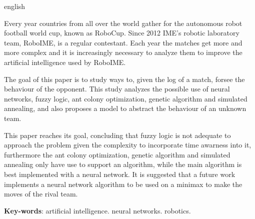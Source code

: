 \documentclass[
	12pt,				%
	oneside,			%
	a4paper,			%
	english,			%
	brazil,				%
	]{ime-abntex2}
\begin{document}
\begin{resumo}[Abstract]
\begin{otherlanguage*}{english}


Every year countries from all over the world gather for the autonomous robot
football world cup, known as RoboCup. Since 2012 IME's robotic laboratory team,
RoboIME, is a regular contestant. Each year the matches get more and more
complex and it is increasingly necessary to analyze them to improve the
artificial intelligence used by RoboIME.

The goal of this paper is to study ways to, given the log of a match, forsee
the behaviour of the opponent. This study analyzes the possible use of neural
networks, fuzzy logic, ant colony optimization, genetic algorithm and simulated
annealing, and also proposes a model to abstract the behaviour of an unknown
team.

This paper reaches its goal, concluding that fuzzy logic is not adequate to
approach the problem given the complexity to incorporate time awarness into it,
furthermore the ant colony optimization, genetic algorithm and simulated
annealing only have use to support an algorithm, while the main algorithm is
best implemented with a neural network. It is suggested that a future work
implements a neural network algorithm to be used on a minimax to make the moves
of the rival team.



\textbf{Key-words}: artificial intelligence. neural networks. robotics.
\end{otherlanguage*}
\end{resumo}
\end{document}
